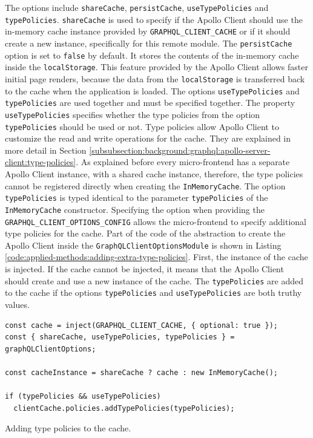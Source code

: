 \noindent The options include \texttt{shareCache}, \texttt{persistCache}, \texttt{useTypePolicies} and \texttt{typePolicies}. \texttt{shareCache} is used to specify if the Apollo Client should use the in-memory cache instance provided by \texttt{GRAPHQL\_CLIENT\_CACHE} or if it should create a new instance, specifically for this remote module. The \texttt{persistCache} option is set to \texttt{false} by default. It stores the contents of the in-memory cache inside the \texttt{localStorage}. This feature provided by the Apollo Client allows faster initial page renders, because the data from the \texttt{localStorage} is transferred back to the cache when the application is loaded. The options \texttt{useTypePolicies} and \texttt{typePolicies} are used together and must be specified together. The property \texttt{useTypePolicies} specifies whether the type policies from the option \texttt{typePolicies} should be used or not. Type policies allow Apollo Client to customize the read and write operations for the cache. They are explained in more detail in Section \ref{subsubsection:background:graphql:apollo-server-client:type-policies}. As explained before every micro-frontend has a separate Apollo Client instance, with a shared cache instance, therefore, the type policies cannot be registered directly when creating the \texttt{InMemoryCache}. The option \texttt{typePolicies} is typed identical to the parameter \texttt{typePolicies} of the \texttt{InMemoryCache} constructor. Specifying the option when providing the \texttt{GRAPHQL\_CLIENT\_OPTIONS\_CONFIG} allows the micro-frontend to specify additional type policies for the cache. Part of the code of the abstraction to create the Apollo Client inside the \texttt{GraphQLClientOptionsModule} is shown in Listing \ref{code:applied-methods:adding-extra-type-policies}. First, the instance of the cache is injected. If the cache cannot be injected, it means that the Apollo Client should create and use a new instance of the cache. The \texttt{typePolicies} are added to the cache if the options \texttt{typePolicies} and \texttt{useTypePolicies} are both truthy values.

\ifshowListings
\begin{listing}[H]
\begin{verbatim}
const cache = inject(GRAPHQL_CLIENT_CACHE, { optional: true });
const { shareCache, useTypePolicies, typePolicies } = graphQLClientOptions;

const cacheInstance = shareCache ? cache : new InMemoryCache();

if (typePolicies && useTypePolicies)
  clientCache.policies.addTypePolicies(typePolicies);
\end{verbatim}
\caption{Adding type policies to the cache.}\label{code:applied-methods:adding-extra-type-policies}
\end{listing}
\fi
